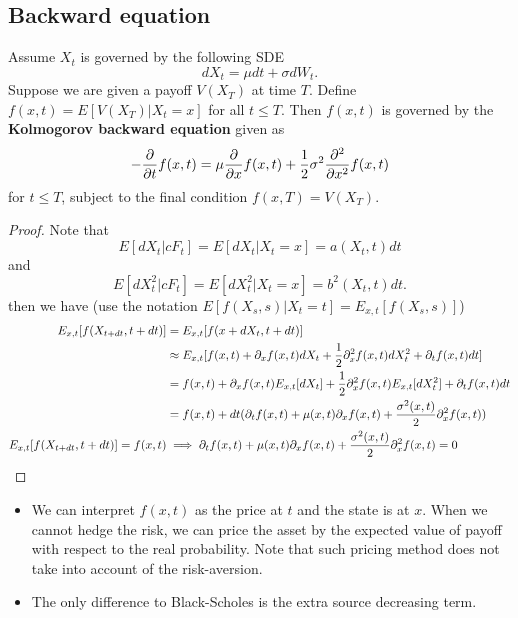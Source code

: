 \begin{refsection}
\subsection{Backward equation}
\begin{theorem}\label{ch:fokker-planck-equation:th:FeymanKacBackwardEquation}
	Assume $X_t$ is governed by the following SDE
	$$dX_t = \mu dt + \sigma dW_t. $$
	Suppose we are given a payoff $V(X_T)$ at time $T$. Define $f(x,t) = E[V(X_T)|X_t = x]$ for all $t\leq T$. Then $f(x,t)$ is governed by the \textbf{Kolmogorov backward equation} given as
	$$-\frac{\partial }{\partial t} f(x,t) = \mu \frac{\partial}{\partial x} f(x,t) + \frac{1}{2}\sigma^2 \frac{\partial^2}{\partial x^2} f(x,t)$$
	for $t \leq T$, subject to the final condition $f(x,T) = V(X_T)$.
\end{theorem}
\begin{proof}
	Note that
	$$E[dX_t|cF_t] = E[dX_t|X_t=x] = a(X_t,t)dt$$
	and
	$$E[dX_t^2|cF_t] = E[dX_t^2|X_t=x] = b^2(X_t,t)dt.$$
	then we have
	(use the notation $E[f(X_s,s)|X_t = t] = E_{x,t}[f(X_s,s)]$)
	\begin{align*}
	E_{x,t}[f(X_{t+dt},t+dt)] &= E_{x,t}[f(x + dX_t, t+dt)]\\
	&\approx E_{x,t}[f(x,t) + \partial_x f(x,t)dX_t + \frac{1}{2}\partial_x^2 f(x,t)dX_t^2 + \partial_t f(x,t)dt]\\
	&= f(x,t) + \partial_x f(x,t) E_{x,t}[dX_t] + \frac{1}{2}\partial_x^2 f(x,t) E_{x,t}[dX_t^2] + \partial_t f(x,t) dt \\
	&= f(x,t) + dt(\partial_t f(x,t) + \mu(x,t)\partial_x f(x,t) + \frac{\sigma^2(x,t)}{2} \partial_x^2 f(x,t))\\
	E_{x,t}[f(X_{t+dt},t+dt)] = f(x,t) &\implies  \partial_t f(x,t) + \mu(x,t)\partial_x f(x,t) + \frac{\sigma^2(x,t)}{2} \partial_x^2 f(x,t) = 0
	\end{align*}
\end{proof}

\begin{remark}[interpretation]\hfill
	\begin{itemize}
		\item We can interpret $f(x,t)$ as the price at $t$ and the state is at $x$. When we cannot hedge the risk, we can price the asset by the expected value of payoff with respect to the real probability. Note that such pricing method does not take into account of the risk-aversion.  
		\item The only difference to Black-Scholes is the extra source decreasing term. 
	\end{itemize}
\end{remark}


\end{refsection}
